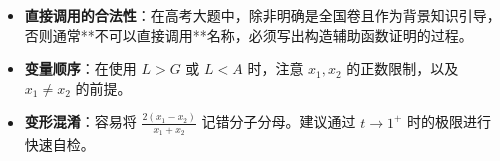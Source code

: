 \begin{trapbox}
\begin{itemize}
    \item \textbf{直接调用的合法性}：在高考大题中，除非明确是全国卷且作为背景知识引导，否则通常**不可以直接调用**名称，必须写出构造辅助函数证明的过程。
    \item \textbf{变量顺序}：在使用 $L > G$ 或 $L < A$ 时，注意 $x_1, x_2$ 的正数限制，以及 $x_1 \neq x_2$ 的前提。
    \item \textbf{变形混淆}：容易将 $\frac{2(x_1-x_2)}{x_1+x_2}$ 记错分子分母。建议通过 $t \to 1^+$ 时的极限进行快速自检。
\end{itemize}
\end{trapbox}